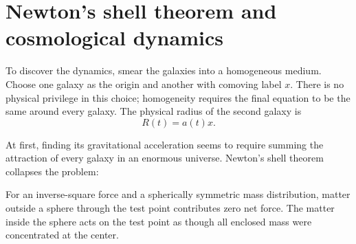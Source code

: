 \begin{classroomqa}
\end{classroomqa}

\begin{classroomqa}
\end{classroomqa}

\section{Newton's shell theorem and cosmological dynamics}

To discover the dynamics, smear the galaxies into a homogeneous medium.
Choose one galaxy as the origin and another with comoving label \(x\).
There is no physical privilege in this choice; homogeneity requires the
final equation to be the same around every galaxy. The physical radius of
the second galaxy is
\begin{equation}
  R(t)=a(t)x.
  \label{eq:radius-ax}
\end{equation}

At first, finding its gravitational acceleration seems to require summing
the attraction of every galaxy in an enormous universe. Newton's shell
theorem collapses the problem:

\begin{proposition}
For an inverse-square force and a spherically symmetric mass distribution,
matter outside a sphere through the test point contributes zero net force.
The matter inside the sphere acts on the test point as though all enclosed
mass were concentrated at the center.
\end{proposition}

